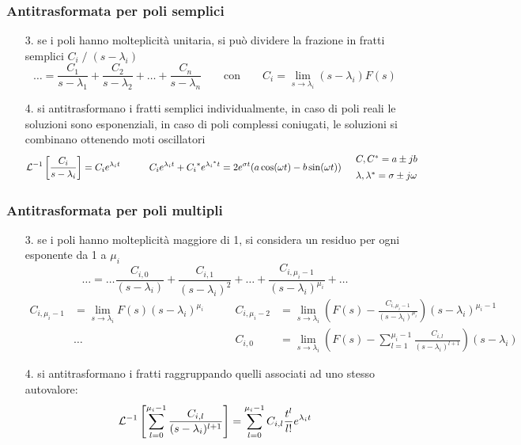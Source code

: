 \subsubsection*{Antitrasformata per poli semplici}
\begin{itemize}
	\item[3.] se i poli hanno molteplicità unitaria, si può dividere la frazione in fratti semplici \(C_i \; / \; (s-\lambda_i)\)
	\[\dots = \frac{C_1}{s-\lambda_1} + \frac{C_2}{s-\lambda_2} + \dots + \frac{C_n}{s-\lambda_n} \qquad \text{con} \qquad C_i = \lim_{s \to \lambda_i} (s-\lambda_i) F(s)\]
	\item[4.] si antitrasformano i fratti semplici individualmente, in caso di poli reali le soluzioni sono esponenziali, in
	caso di poli complessi coniugati, le soluzioni si combinano ottenendo moti oscillatori
	\[\mathcal{L}^{-1}\left[\frac{C_i}{s-\lambda_i}\right] = C_i e^{\lambda_i t} \qquad\quad C_i e^{\lambda_i t} + {C_i}^* e^{{\lambda_i}^* t} = 2e^{\sigma t} (a \cos(\omega t) - b \sin(\omega t)) \quad \begin{array}{l} C,C^* = a \pm jb \\[5pt] \lambda,\lambda^* = \sigma \pm j\omega \end{array}\]
\end{itemize}

\newpage

\subsubsection*{Antitrasformata per poli multipli}
\begin{itemize}
	\item[3.] se i poli hanno molteplicità maggiore di 1, si considera un residuo per ogni esponente da 1 a \(\mu_i\)
	\[\dots = \dots \frac{C_{i,0}}{(s-\lambda_i)} + \frac{C_{i,1}}{(s-\lambda_i)^2} + \dots + \frac{C_{i,\mu_i-1}}{(s-\lambda_i)^{\mu_i}} + \dots\]
	\begin{align*}
		C_{i,\mu_i-1} &= \lim_{s \to \lambda_i} F(s) (s-\lambda_i)^{\mu_i} &\qquad C_{i,\mu_i-2} &= \lim_{s \to \lambda_i} \left(F(s) - \frac{C_{i,\mu_i-1}}{(s-\lambda_i)^{\mu_i}} \right) (s-\lambda_i)^{\mu_i-1} \\
		\quad &\dots\quad  &\qquad C_{i,0} &= \lim_{s \to \lambda_i} \left(F(s) - \sum_{l=1}^{\mu_i-1} \frac{C_{i,l}}{(s-\lambda_i)^{l+1}} \right) (s-\lambda_i)
	\end{align*}
	\item[4.] si antitrasformano i fratti raggruppando quelli associati ad uno stesso autovalore:
	\[\mathcal{L}^{-1}\left[ \sum_{l=0}^{\mu_i-1} \frac{C_{i,l}}{(s-\lambda_i)^{l+1}} \right] = \sum_{l=0}^{\mu_i-1} C_{i,l} \frac{t^l}{l!} e^{\lambda_i t}\]
\end{itemize}

